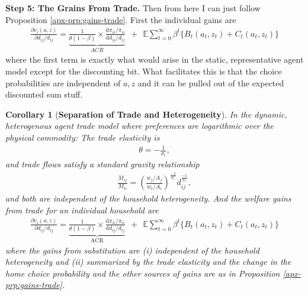 \documentclass[12pt,pdftex]{article}
\newtheorem{corr}{Corollary}
\begin{document}
\begin{onehalfspacing}
\textbf{Step 5: The Grains From Trade.} Then from here I can just follow Proposition \ref{apx-prp:gains-trade}. First the individual gains are
{\footnotesize
\begin{align}
\nonumber
\frac{\partial v_i(a, z)}{\partial d_{ij} / d_{ij}} = \underbrace{\frac{1}{\theta (1-\beta)} \times \frac{\mathrm{d} \pi_{ii} / \pi_{ii}}{\mathrm{d}d_{ij} / d_{ij}}}_{ACR} \ \ + \ \
\mathbb{E} \sum_{t = 0}^{\infty} \beta^{t} \bigg \{ B_{t}(a_{t},z_{t}) + C_{t}(a_{t},z_{t}) \bigg \}
\end{align}
}where the first term is exactly what would arise in the static, representative agent model except for the discounting bit. What facilitates this is that the choice probabilities are independent of $a,z$ and it can be pulled out of the expected discounted sum stuff.

\begin{corr}[\textbf{Separation of Trade and Heterogeneity}] In the dynamic, heterogenous agent trade model where preferences are logarithmic over the physical commodity: The trade elasticity is
\begin{align}
\theta = -\frac{1}{\sigma_{\epsilon}}, \nonumber
\end{align}
and trade flows satisfy a standard gravity relationship
\begin{align}
\frac{M_{ij}}{M_{ii}} = \left( \frac{  w_{j} / A_{j} }{  w_{i} / A_{i} } \right)^{\frac{-1}{\sigma_{\epsilon}}} d_{ij}^{\frac{-1}{\sigma_{\epsilon}}}, \nonumber
\end{align}
and both are independent of the household heterogeneity. And the welfare gains from trade for an individual household are
\begin{align}
\nonumber
\frac{\partial v_i(a, z)}{\partial d_{ij} / d_{ij}} = \underbrace{\frac{1}{\theta (1-\beta)} \times \frac{\mathrm{d} \pi_{ii} / \pi_{ii}}{\mathrm{d}d_{ij} / d_{ij}}}_{\mbox{ACR}} \ \ + \ \
\mathbb{E} \sum_{t = 0}^{\infty} \beta^{t} \bigg \{ B_{t}(a_{t},z_{t}) + C_{t}(a_{t},z_{t}) \bigg \}
\end{align}
where the gains from substitution are (i) independent of the household heterogeneity and (ii) summarized by the trade elasticity and the change in the home choice probability and the other sources of gains are as in Proposition \ref{apx-prp:gains-trade}.
\end{corr}





\newpage






\end{onehalfspacing}
\end{document}
